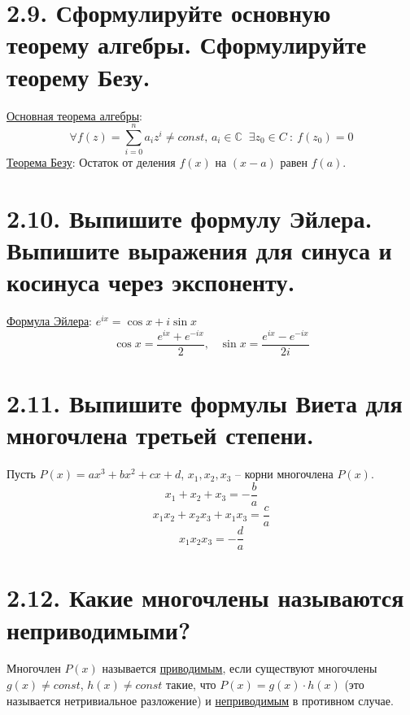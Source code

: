 \documentclass{article}
\begin{document}
\section*{\LARGE 2.9. Сформулируйте основную теорему алгебры. Сформулируйте теорему Безу. }

\underline{Основная теорема алгебры}:
$$
\forall f(z) = \sum_{i = 0}^n{a_iz^i} \ne const,\, a_i \in \mathbb{C} \;\; \exists z_0 \in C \::\: f(z_0) = 0
$$
\underline{Теорема Безу}:
\newline Остаток от деления $f(x)$ на $(x - a)$ равен $f(a)$.

\section*{\LARGE 2.10. Выпишите формулу Эйлера. Выпишите выражения для синуса и косинуса через экспоненту.  }

\underline{Формула Эйлера}:
$ e^{ix} = \cos{x} + i\sin{x} $
$$ \cos{x} = \frac{e^{ix} + e^{-ix}}{2}, \;\;\; \sin{x} = \frac{e^{ix} - e^{-ix}}{2i} $$

\section*{\LARGE 2.11. Выпишите формулы Виета для многочлена третьей степени.  }

Пусть $P(x) = ax^3 + bx^2 + cx + d$, $x_1, x_2, x_3$ -- корни многочлена $P(x)$.
$$ x_1 + x_2 + x_3 = -\frac{b}{a} $$
$$ x_1x_2 + x_2x_3 + x_1x_3 = \frac{c}{a} $$
$$ x_1x_2x_3 = -\frac{d}{a} $$

\section*{\LARGE 2.12. Какие многочлены называются неприводимыми? }

Многочлен $P(x)$ называется \underline{приводимым}, если существуют многочлены 
\newline $g(x) \ne const$, $h(x) \ne const$ такие, что $P(x) = g(x) \cdot h(x)$ (это называется нетривиальное разложение) и \underline{неприводимым} в противном случае.
\end{document}
